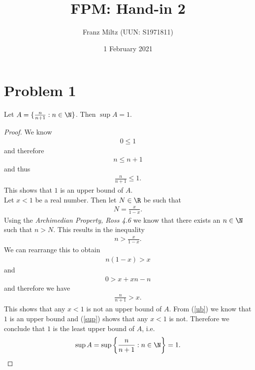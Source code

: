 \documentclass{article}
\begin{document}
\title{FPM: Hand-in 2}
\author{Franz Miltz (UUN: S1971811)}
\date{1 February 2021}
\maketitle

\section*{Problem 1}

\begin{claim*}
   Let $A=\{\frac{n}{n+1}:n\in\N\}$. Then $\sup A = 1$.
\end{claim*}
\begin{proof}
   We know
   \begin{align*}
      0 \leq 1
   \end{align*}
   and therefore
   \begin{align*}
      n \leq n + 1
   \end{align*}
   and thus
   \begin{align}
      \label{ub}
      \frac{n}{n+1}\leq 1.
   \end{align}
   This shows that $1$ is an upper bound of $A$.\\
   Let $x<1$ be a real number. Then let $N\in\R$ be such that
   \begin{align*}
      N = \frac{x}{1-x}.
   \end{align*}
   Using the \emph{Archimedian Property, Ross 4.6} we know that there exists
   an $n\in\N$ such that $n > N$. This results in the inequality
   \begin{align*}
      n > \frac{x}{1-x}.
   \end{align*}
   We can rearrange this to obtain
   \begin{align*}
      n(1-x) > x
   \end{align*}
   and
   \begin{align*}
      0 > x + xn - n
   \end{align*}
   and therefore we have
   \begin{align}
      \label{sup}
      \frac{n}{n+1} > x.
   \end{align}
   This shows that any $x<1$ is not an upper bound of $A$.
   From (\ref{ub}) we know that $1$ is an upper bound and (\ref{sup}) shows
   that any $x<1$ is not. Therefore we conclude that
   $1$ is the least upper bound of $A$, i.e.
   \begin{align*}
      \sup A = \sup\left\{\frac{n}{n+1}:n\in\N\right\} = 1.
   \end{align*}
\end{proof}
\end{document}
